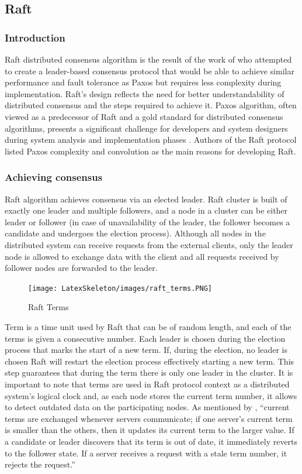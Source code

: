 \documentclass[oneside,12pt]{book}
\begin{document}
\subsection{Raft}
\subsubsection{Introduction}
\par Raft distributed consensus algorithm is the result of the work of \cite{10.5555/2643634.2643666} who attempted to create a leader-based consensus protocol that would be able to achieve similar performance and fault tolerance as Paxos but requires less complexity during implementation. Raft’s design reflects the need for better understandability of distributed consensus and the steps required to achieve it. Paxos algorithm, often viewed as a predecessor of Raft and a gold standard for distributed consensus algorithms, presents a significant challenge for developers and system designers during system analysis and implementation phases \citep{10.5555/2643634.2643666}. Authors of the Raft protocol listed Paxos complexity and convolution as the main reasons for developing Raft.

\subsubsection{Achieving consensus}
Raft algorithm achieves consensus via an elected leader. Raft cluster is built of exactly one leader and multiple followers, and a node in a cluster can be either leader or follower (in case of unavailability of the leader, the follower becomes a candidate and undergoes the election process).  Although all nodes in the distributed system can receive requests from the external clients, only the leader node is allowed to exchange data with the client and all requests received by follower nodes are forwarded to the leader.
\begin{figure}[H]
\centering
\texttt{[image: LatexSkeleton/images/raft\_terms.PNG]}
\caption{Raft Terms}\citep{10.5555/2643634.2643666}
\end{figure}
\noindent Term is a time unit used by Raft that can be of random length, and each of the terms is given a consecutive number. Each leader is chosen during the election process that marks the start of a new term. If, during the election, no leader is chosen Raft will restart the election process effectively starting a new term. This step guarantees that during the term there is only one leader in the cluster. It is important to note that terms are used in Raft protocol context as a distributed system’s logical clock and, as each node stores the current term number, it allows to detect outdated data on the participating nodes. As mentioned by \cite{10.5555/2643634.2643666}, “current terms are exchanged whenever servers communicate; if one server’s current term is smaller than the others, then it updates its current term to the larger value. If a candidate or leader discovers that its term is out of date, it immediately reverts to the follower state. If a server receives a request with a stale term number, it rejects the request.”
\end{document}
